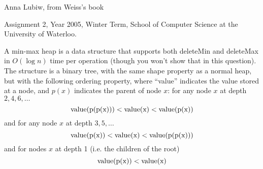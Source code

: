 \begin{authorship} Anna Lubiw, from Weiss's book
\end{authorship}
\begin{usage}
Assignment 2, Year 2005, Winter Term, School of Computer Science at the University of Waterloo.
\end{usage}

A min-max heap is a data structure that supports both deleteMin and
deleteMax in $O(\log n)$ time per operation (though you won't show that
in this question).
%
The structure is a binary tree, with the same shape property as a
normal heap, but with the following ordering property, where ``value''
indicates the value stored at a node, and $p(x)$ indicates the parent
of node $x$: for any node $x$ at depth $2, 4, 6, \ldots$ $$
\rm{value}(p(p(x))) < \rm{value}(x) < \rm{value}(p(x))$$
%
and for any node $x$ at depth $3, 5, \ldots$
%
$$ \rm{value}(p(x)) < \rm{value}(x) < \rm{value}(p(p(x)))$$
%
and for nodes $x$ at depth 1 (i.e. the children of the root)
%
$$\rm{value}(p(x)) < \rm{value}(x)$$
%

